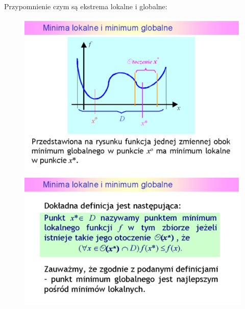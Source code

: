 \documentclass[a4paper,twoside]{report}
\begin{document}
Przypomnienie czym są ekstrema lokalne i globalne:

\begin{figure}[H]
	\includegraphics[scale=1.2
	]{obrazy/optymalizacja/opt2.png}
\end{figure}
\end{document}
